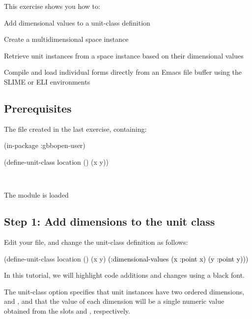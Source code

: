 \documentclass[10pt,twoside,english,pdftex]{article}
\begin{document}
\fndocrule

This exercise shows you how to:
\begin{tightitemize}
\item Add dimensional values to a unit-class definition
\item Create a multidimensional space instance
\item Retrieve unit instances from a space instance based on their
  dimensional values
\item Compile and load individual forms directly from an Emacs file
  buffer using the SLIME or ELI environments
\end{tightitemize}

\fndocrule

\subsection*{Prerequisites}

\begin{tightitemize}
\item The  file created in the last exercise, containing:
%
\W\supp\notpretop
\begin{example}
\textcolor{darkergray}{%
  (in-package :gbbopen-user)

  (define-unit-class location ()
    (x y))}
\end{example}
\W\\

\item The  module is loaded
\end{tightitemize}

\subsection*{Step 1: Add dimensions to the  unit class}

Edit your  file, and change the
 unit-class definition as follows:
%
\W\supp
\begin{example}
\textcolor{darkergray}{%
  (define-unit-class location ()
    (x y)
    \textcolor{black}{(:dimensional-values
      (x :point x)
      (y :point y))})}
\end{example}
%
In this tutorial, we will highlight code additions and changes using a
black font.

The  unit-class option specifies that
 unit instances have two ordered dimensions, 
and , and that the value of each dimension will be a single
numeric value obtained from the slots  and ,
respectively.
\end{document}
